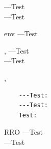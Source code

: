 \documentclass{ltxdoc}
\begin{document}
\noindent
\DescribeMacro{\DescribeMacro}
    ---Test\\
    ---Test

\begin{environment}{env}
    ---Test
\end{environment}
\begin{macro}{\hey,\you}
    ---Test\\
    ---Test
\end{macro}
\begin{macro}{\hey,\you}
    \\
\end{macro}

\begin{verbatim}
    ---Test:
    ---Test:
    Test:
\end{verbatim}

\begin{name}{RRO}
    ---Test\\
    ---Test
\end{name}
\end{document}
